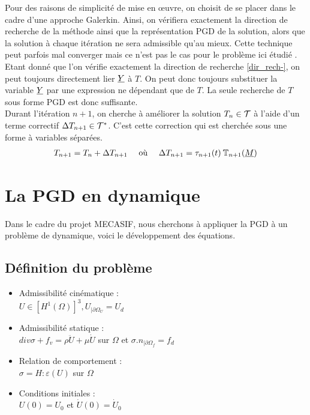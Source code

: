 \documentclass[12pt,a4paper]{report}
\begin{document}
 Pour des raisons de simplicité de mise en \oe{}uvre, on choisit de se placer dans le cadre d'une approche Galerkin. Ainsi, on vérifiera exactement la direction de recherche de la méthode ainsi que la représentation PGD de la solution, alors que la solution à chaque itération ne sera admissible qu'au mieux. Cette technique peut parfois mal converger mais ce n'est pas le cas pour le problème ici étudié \cite{Lad10}.\\ 
Etant donné que l'on vérifie exactement la direction de recherche \eqref{dir_rech-}, on peut toujours directement lier $\underline{Y}$ à $T$. On peut donc toujours substituer la variable $\underline{Y}$ par une expression ne dépendant que de $T$. La seule recherche de $T$ sous forme PGD est donc suffisante.\\
Durant l'itération $n+1$, on cherche à améliorer la solution $T_n \in \mathcal{T}$ à l'aide d'un terme correctif $\Delta T_{n+1} \in \mathcal{T}^*$. C'est cette correction qui est cherchée sous une forme à variables séparées. 
\begin{equation}
\begin{aligned}
T_{n+1}= T_n + \Delta T_{n+1} \quad \textrm{ où } \quad \Delta T_{n+1} = \tau_{n+1}(t) \: \mathbb{T}_{n+1} (\underline{M})
\end{aligned}
\end{equation}


\section{La PGD en dynamique}

Dans le cadre du projet MECASIF, nous cherchons à appliquer la PGD à un problème de dynamique, voici le développement des équations.

\subsection{Définition du problème}

\begin{itemize}
\item Admissibilité cinématique :
	\\$U \in [H^1(\Omega)]^3, U_{|\partial \Omega_U} = U_d $
\item Admissibilité statique :
	\\$ div \sigma + f_v = \rho \ddot{U} + \mu \dot{U}$ sur $\Omega$ 
		et $\sigma . n _{|\partial \Omega_f} = f_d$
\item Relation de comportement :
	\\$\sigma = H : \varepsilon (U)$ sur $ \Omega$
\item Conditions initiales :
	\\$U(0) = U_0$ et $ \dot{U}(0) = \dot{U}_0$
\end{itemize}
\end{document}
